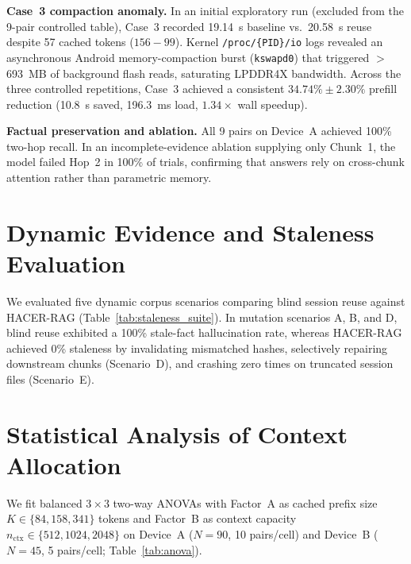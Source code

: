 \documentclass[10pt,conference]{IEEEtran}
\newcommand{\systemname}{HACER-RAG}
\begin{document}
\textbf{Case~3 compaction anomaly.} In an initial exploratory run (excluded from the 9-pair controlled table), Case~3 recorded 19.14~s baseline vs.\ 20.58~s reuse despite 57 cached tokens ($156{-}99$). Kernel \texttt{/proc/\allowbreak\{PID\}/\allowbreak io} logs revealed an asynchronous Android memory-compaction burst (\texttt{kswapd0}) that triggered $>$693~MB of background flash reads, saturating LPDDR4X bandwidth. Across the three controlled repetitions, Case~3 achieved a consistent $34.74\%\pm2.30\%$ prefill reduction (10.8~s saved, 196.3~ms load, $1.34\times$ wall speedup).

\textbf{Factual preservation and ablation.} All 9 pairs on Device~A achieved 100\% two-hop recall. In an incomplete-evidence ablation supplying only Chunk~1, the model failed Hop~2 in 100\% of trials, confirming that answers rely on cross-chunk attention rather than parametric memory.

\section{Dynamic Evidence and Staleness Evaluation}
\label{sec:results_staleness}
We evaluated five dynamic corpus scenarios comparing blind session reuse against \systemname{} (Table~\ref{tab:staleness_suite}). In mutation scenarios A, B, and D, blind reuse exhibited a 100\% stale-fact hallucination rate, whereas \systemname{} achieved 0\% staleness by invalidating mismatched hashes, selectively repairing downstream chunks (Scenario~D), and crashing zero times on truncated session files (Scenario~E).

\section{Statistical Analysis of Context Allocation}
\label{sec:statistical_analysis}
We fit balanced $3\times3$ two-way ANOVAs with Factor~A as cached prefix size $K\in\{84,158,341\}$ tokens and Factor~B as context capacity $n_{\text{ctx}}\in\{512,1024,2048\}$ on Device~A ($N{=}90$, 10 pairs/cell) and Device~B ($N{=}45$, 5 pairs/cell; Table~\ref{tab:anova}).
\end{document}
